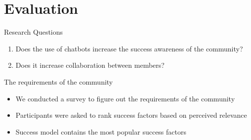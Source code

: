 \section{Evaluation}
\begin{frame}{Research Questions}
  \begin{enumerate}
    \item Does the use of chatbots increase the success awareness of the community?
    \item Does it increase collaboration between members?
  \end{enumerate}
\end{frame}


\begin{frame}{The requirements of the community}
  \begin{itemize}
    \item We conducted a survey to figure out the requirements of the community
    \item Participants were asked to rank success factors based on perceived relevance
    \item Success model contains the most popular success factors
  \end{itemize}
\end{frame}



